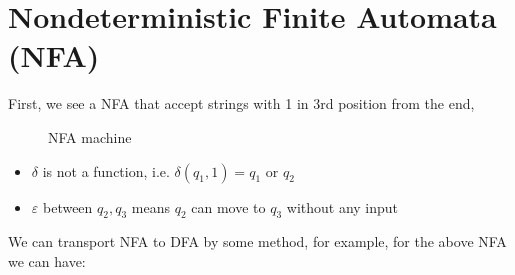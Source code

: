
\section{Nondeterministic Finite Automata (NFA)}

First, we see a NFA that accept strings with 1 in 3rd position from the end,

\begin{figure}[H]
    \centering
    \caption{NFA machine}
\end{figure}

\begin{itemize}
    \item $\delta$ is not a function, i.e. $\delta(q_1, 1) = q_1 \text{ or } q_2$
    \item $\varepsilon$ between $q_2, q_3$ means $q_2$ can move to $q_3$ without any input
\end{itemize}

\newpage

We can transport NFA to DFA by some method, for example, for the above NFA we can have:


